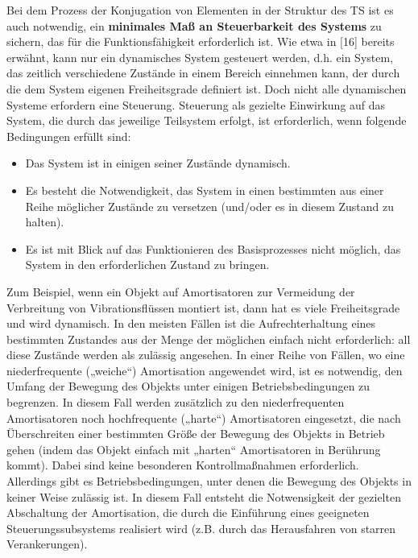 \documentclass[11pt,a4paper]{article}
\begin{document}
Bei dem Prozess der Konjugation von Elementen in der Struktur des TS ist es
auch notwendig, ein \textbf{minimales Maß an Steuerbarkeit des Systems} zu
sichern, das für die Funktionsfähigkeit erforderlich ist. Wie etwa in [16]
bereits erwähnt, kann nur ein dynamisches System gesteuert werden, d.h. ein
System, das zeitlich verschiedene Zustände in einem Bereich einnehmen kann,
der durch die dem System eigenen Freiheitsgrade definiert ist. Doch nicht alle
dynamischen Systeme erfordern eine Steuerung. Steuerung als gezielte
Einwirkung auf das System, die durch das jeweilige Teilsystem erfolgt, ist
erforderlich, wenn folgende Bedingungen erfüllt sind:
\begin{itemize}
\item Das System ist in einigen seiner Zustände dynamisch.
\item Es besteht die Notwendigkeit, das System in einen bestimmten aus einer
  Reihe möglicher Zustände zu versetzen (und/oder es in diesem Zustand zu
  halten).
\item Es ist mit Blick auf das Funktionieren des Basisprozesses nicht möglich,
  das System in den erforderlichen Zustand zu bringen.
\end{itemize}
\begin{emph}  
  Zum Beispiel, wenn ein Objekt auf Amortisatoren zur Vermeidung der
  Verbreitung von Vibrationsflüssen montiert ist, dann hat es viele
  Freiheitsgrade und wird dynamisch. In den meisten Fällen ist die
  Aufrechterhaltung eines bestimmten Zustandes aus der Menge der möglichen
  einfach nicht erforderlich: all diese Zustände werden als zulässig
  angesehen. In einer Reihe von Fällen, wo eine niederfrequente („weiche“)
  Amortisation angewendet wird, ist es notwendig, den Umfang der Bewegung des
  Objekts unter einigen Betriebsbedingungen zu begrenzen. In diesem Fall
  werden zusätzlich zu den niederfrequenten Amortisatoren noch hochfrequente
  („harte“) Amortisatoren eingesetzt, die nach Überschreiten einer bestimmten
  Größe der Bewegung des Objekts in Betrieb gehen (indem das Objekt einfach
  mit „harten“ Amortisatoren in Berührung kommt). Dabei sind keine besonderen
  Kontrollmaßnahmen erforderlich. Allerdings gibt es Betriebsbedingungen,
  unter denen die Bewegung des Objekts in keiner Weise zulässig ist.  In
  diesem Fall entsteht die Notwensigkeit der gezielten Abschaltung der
  Amortisation, die durch die Einführung eines geeigneten Steuerungssubsystems
  realisiert wird (z.B. durch das Herausfahren von starren Verankerungen).
\end{emph}
\end{document}
